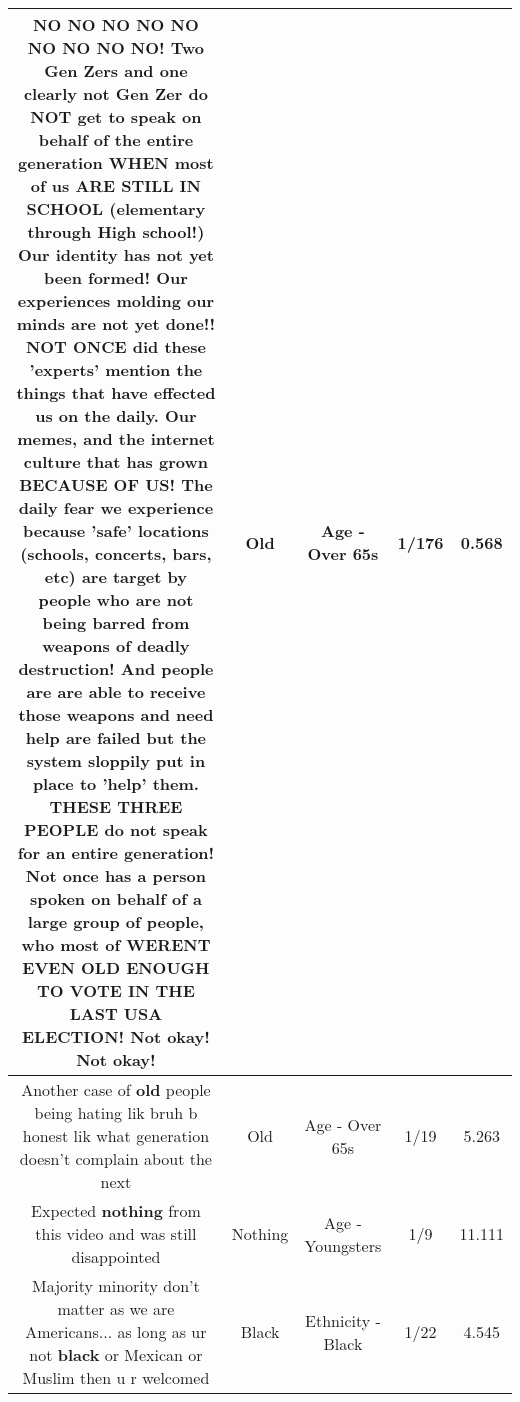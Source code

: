\documentclass[11pt]{article}
\newlength\mylength
\begin{document}
\begin{center}
\begin{longtable}{|C{.65\mylength}|C{.30\mylength}|C{.12\mylength}|C{.12\mylength}|C{.12\mylength}|}
  \small NO NO NO NO NO NO NO NO NO! Two Gen Zers and one clearly not Gen Zer do NOT get to speak on behalf of the entire generation WHEN most of us ARE STILL IN SCHOOL (elementary through High school!) Our identity has not yet been formed! Our experiences molding our minds are not yet done!! NOT ONCE did these 'experts' mention the things that have effected us on the daily. Our memes, and the internet culture that has grown BECAUSE OF US! The daily fear we experience because 'safe' locations (schools, concerts, bars, etc) are target by people who are not being barred from weapons of deadly destruction! And people are are able to receive those weapons and need help are failed but the system sloppily put in place to 'help' them. THESE THREE PEOPLE do not speak for an entire generation! Not once has a person spoken on behalf of a large group of people, who most of  WERENT EVEN \textbf{OLD} ENOUGH TO VOTE IN THE LAST USA ELECTION! Not okay! Not okay!\normalsize   & Old & Age - Over 65s & 1/176 & 0.568 \\  \hline
  \small Another case of \textbf{old} people being hating lik bruh b honest lik what generation doesn't complain about the next\normalsize   & Old & Age - Over 65s & 1/19 & 5.263 \\  \hline
  \small Expected \textbf{nothing} from this video and was still disappointed\normalsize   & Nothing & Age - Youngsters & 1/9 & 11.111 \\  \hline
  \small Majority minority don't matter as we are Americans...  as long as ur not \textbf{black} or Mexican or Muslim then u r welcomed\normalsize   & Black & Ethnicity - Black & 1/22 & 4.545 \\  \hline

\end{longtable}
\end{center}
\end{document}
